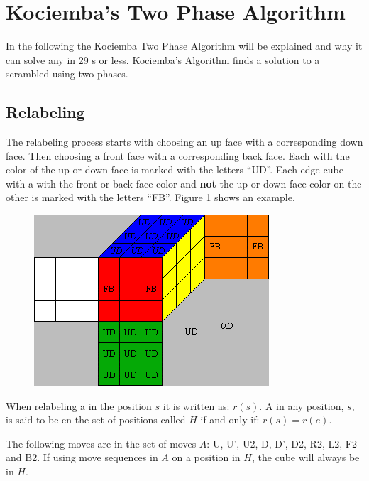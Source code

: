\section{Kociemba's Two Phase Algorithm}
In the following the Kociemba Two Phase Algorithm\cite{kociemba09} will be explained and why it can solve any \rubik{} in 29 \twist{}s or less. Kociemba's Algorithm finds a solution to a scrambled \rubik{} using two phases.

\subsection{Relabeling}
The relabeling process  starts with choosing an up face with a corresponding down face. Then choosing a front face with a corresponding back face. Each \facelet{} with the color of the up or down face is marked with the letters ``UD''. Each edge cube with a \facelet{} with the front or back face color and \textbf{not} the up or down face color on the other \facelet{} is marked with the letters ``FB''. Figure \ref{fig:relabel1} shows an example.

\begin{figure}[hb]
	\centering
		\includegraphics{input/pics/relabel1}
	\caption{}
	\label{fig:relabel1}
\end{figure}

When relabeling a \rubik{} in the position $s$ it is written as: $r(s)$. A \rubik{} in any position, $s$, is said to be en the set of positions called $H$ if and only if: $r(s)=r(e)$.

The following moves are in the set of moves $A$: U, U', U2, D, D', D2, R2, L2, F2 and B2. If using move sequences in $A$ on a position in $H$, the cube will always be in $H$.


